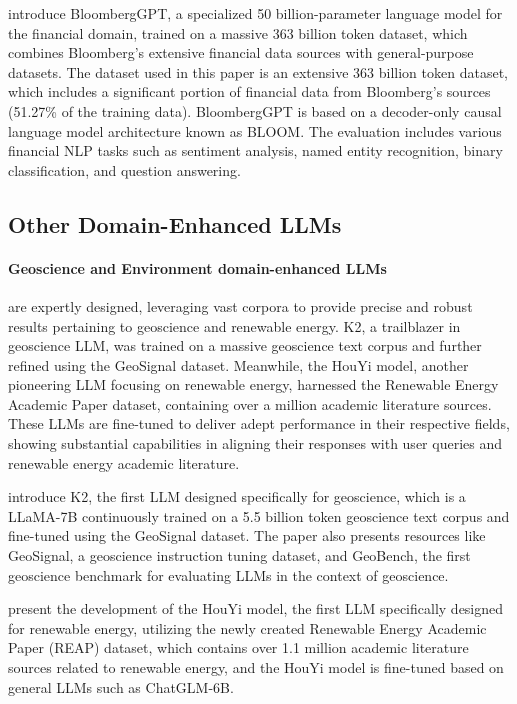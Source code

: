 \citet{BloombergGPT} introduce BloombergGPT, a specialized 50 billion-parameter language model for the financial domain, trained on a massive 363 billion token dataset, which combines Bloomberg's extensive financial data sources with general-purpose datasets.
 The dataset used in this paper is an extensive 363 billion token dataset, which includes a significant portion of financial data from Bloomberg's sources (51.27\% of the training data).
  BloombergGPT is based on a decoder-only causal language model architecture known as BLOOM. The evaluation includes various financial NLP tasks such as sentiment analysis, named entity recognition, binary classification, and question answering.
  

\subsection{Other Domain-Enhanced LLMs}

\paragraph{Geoscience and  Environment domain-enhanced LLMs} are expertly designed, leveraging vast corpora to provide precise and robust results pertaining to geoscience and renewable energy. K2, a trailblazer in geoscience LLM, was trained on a massive geoscience text corpus and further refined using the GeoSignal dataset. Meanwhile, the HouYi model, another pioneering LLM focusing on renewable energy, harnessed the Renewable Energy Academic Paper dataset, containing over a million academic literature sources. These LLMs are fine-tuned to deliver adept performance in their respective fields, showing substantial capabilities in aligning their responses with user queries and renewable energy academic literature. 

\citet{deng2023learning}
 introduce K2, the first LLM designed specifically for geoscience, which is a LLaMA-7B continuously trained on a 5.5 billion token geoscience text corpus and fine-tuned using the GeoSignal dataset.
 The paper also presents resources like GeoSignal, a geoscience instruction tuning dataset, and GeoBench, the first geoscience benchmark for evaluating LLMs in the context of geoscience.
 
\citet{bai2023houyi} present the development of the HouYi model, the first LLM specifically designed for renewable energy, utilizing the newly created Renewable Energy Academic Paper (REAP) dataset, which contains over 1.1 million academic literature sources related to renewable energy, and the HouYi model is fine-tuned based on general LLMs such as ChatGLM-6B.

